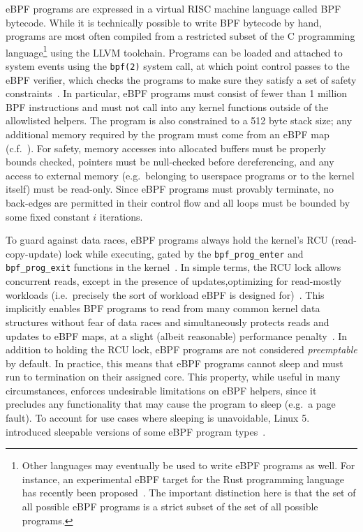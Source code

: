 eBPF programs are expressed in a virtual RISC machine language called BPF bytecode.  While
it is technically possible to write BPF bytecode by hand, programs are most often compiled
from a restricted subset of the C programming language\footnote{Other languages may
eventually be used to write eBPF programs as well.  For instance, an experimental eBPF
target for the Rust programming language has recently been proposed~. The
important distinction here is that the set of all possible eBPF programs is a strict
subset of the set of all possible programs.} using the LLVM toolchain. Programs can be
loaded and attached to system events using the \texttt{bpf(2)} system call, at which point
control passes to the eBPF verifier, which checks the programs to make sure they satisfy
a set of safety constraints~\cite{starovoitov2014_ebpf, gregg2019_bpf}. In particular,
eBPF programs must consist of fewer than 1 million BPF instructions and must not call into
any kernel functions outside of the allowlisted helpers. The program is also constrained
to a 512 byte stack size; any additional memory required by the program must come from an
eBPF map (c.f.~). For safety, memory accesses into allocated buffers
must be properly bounds checked, pointers must be null-checked before dereferencing, and
any access to external memory (e.g.~belonging to userspace programs or to the kernel
itself) must be read-only. Since eBPF programs must provably terminate, no back-edges are
permitted in their control flow and all loops must be bounded by some fixed constant $i$
iterations.

To guard against data races, eBPF programs always hold the kernel's RCU (read-copy-update)
lock while executing, gated by the \texttt{bpf\_prog\_enter} and \texttt{bpf\_prog\_exit}
functions in the kernel~. In simple terms, the RCU lock allows
concurrent reads, except in the presence of updates,optimizing for read-mostly workloads
(i.e.~precisely the sort of workload eBPF is designed for)~\cite{mckenney2007_rcu}. This
implicitly enables BPF programs to read from many common kernel data structures without
fear of data races and simultaneously protects reads and updates to eBPF maps, at a slight
(albeit reasonable) performance penalty~\cite{mckenney2007_rcu}. In addition to holding
the RCU lock, eBPF programs are not considered \textit{preemptable} by default. In
practice, this means that eBPF programs cannot sleep and must run to termination on their
assigned core. This property, while useful in many circumstances, enforces undesirable
limitations on eBPF helpers, since it precludes any functionality that may cause the
program to sleep (e.g.~a page fault). To account for use cases where sleeping is
unavoidable, Linux 5. introduced sleepable versions of some eBPF
program types~.

